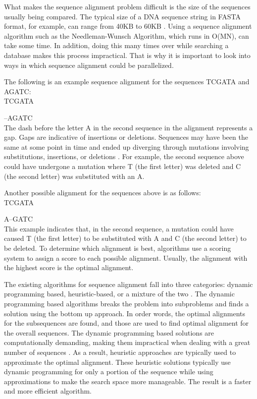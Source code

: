 \documentclass[conference]{IEEEtran}
\begin{document}
What makes the sequence alignment problem difficult is the size of the sequences usually being compared. The typical size of a DNA sequence string in FASTA format, for example, can range from 40KB to 60KB \cite{naveed_siddiqui_ahmed}. Using a sequence alignment algorithm such as the Needleman-Wunsch Algorithm, which runs in O(MN), can take some time. In addition, doing this many times over while searching a database makes this process impractical. That is why it is important to look into ways in which sequence alignment could be parallelized.

The following is an example sequence alignment for the sequences TCGATA and AGATC:\\

\quad TCGATA

\quad –AGATC\\
 
The dash before the letter A in the second sequence in the alignment represents a gap. Gaps are indicative of insertions or deletions. Sequences may have been the same at some point in time and ended up diverging through mutations involving substitutions, insertions, or deletions \cite{settles_2008}. For example, the second sequence above could have undergone a mutation where T (the first letter) was deleted and C (the second letter) was substituted with an A.

Another possible alignment for the sequences above is as follows:\\

\quad TCGATA

\quad A–GATC\\

This example indicates that, in the second sequence, a mutation could have caused T (the first letter) to be substituted with A and C (the second letter) to be deleted. To determine which alignment is best, algorithms use a scoring system to assign a score to each possible alignment. Usually, the alignment with the highest score is the optimal alignment.

The existing algorithms for sequence alignment fall into three categories: dynamic programming based, heuristic-based, or a mixture of the two \cite{chaudhary_liu_matta_yang_2005}. The dynamic programming based algorithms breaks the problem into subproblems and finds a solution using the bottom up approach. In order words, the optimal alignments for the subsequences are found, and those are used to find optimal alignment for the overall sequences. The dynamic programming based solutions are computationally demanding, making them impractical when dealing with a great number of sequences \cite{chaudhary_liu_matta_yang_2005}. As a result, heuristic approaches are typically used to approximate the optimal alignment. These heuristic solutions typically use dynamic programming for only a portion of the sequence while using approximations to make the search space more manageable. The result is a faster and more efficient algorithm.
\end{document}
